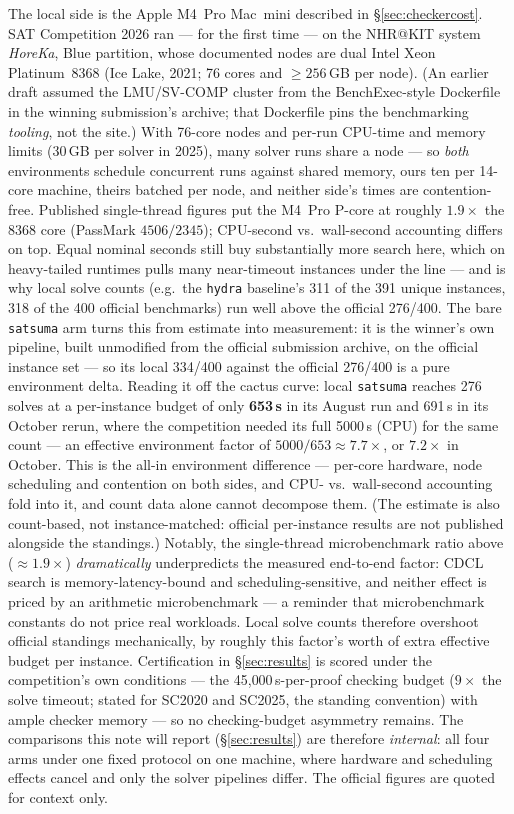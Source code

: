 \documentclass[10pt]{article}
\begin{document}
The local side is the Apple M4~Pro Mac~mini described in
\S\ref{sec:checkercost}. SAT Competition 2026 ran --- for the first
time --- on the NHR@KIT system \emph{HoreKa}, Blue partition, whose
documented nodes are dual Intel Xeon Platinum~8368 (Ice Lake, 2021;
76 cores and $\geq 256$\,GB per node). (An earlier draft assumed the
LMU/SV-COMP cluster from the BenchExec-style Dockerfile in the
winning submission's archive; that Dockerfile pins the benchmarking
\emph{tooling}, not the site.) With 76-core nodes and per-run
CPU-time and memory limits (30\,GB per solver in 2025), many solver
runs share a node --- so \emph{both} environments schedule concurrent
runs against shared memory, ours ten per 14-core machine, theirs
batched per node, and neither side's times are contention-free.
Published single-thread figures put the M4~Pro P-core at roughly
$1.9\times$ the 8368 core (PassMark $4506/2345$); CPU-second vs.\
wall-second accounting differs on top. Equal nominal seconds still
buy substantially more search here, which on heavy-tailed runtimes
pulls many near-timeout instances under the line --- and is why local
solve counts (e.g.\ the \texttt{hydra} baseline's 311 of the 391
unique instances, 318 of the 400 official benchmarks) run well above the
official 276/400. The bare \texttt{satsuma} arm turns this from estimate into
measurement: it is the winner's own pipeline, built unmodified from
the official submission archive, on the official instance set --- so
its local 334/400 against the official 276/400 is a pure environment
delta. Reading it off the cactus curve: local \texttt{satsuma}
reaches 276 solves at a per-instance budget of only \textbf{653\,s}
in its August run and 691\,s in its October rerun, where the
competition needed its full 5000\,s (CPU) for the same count --- an
effective environment factor of
$5000/653 \approx \mathbf{7.7\times}$, or $7.2\times$ in October. This is the all-in
environment difference --- per-core hardware, node scheduling and
contention on both sides, and CPU- vs.\ wall-second accounting fold
into it, and count data alone cannot decompose them. (The estimate is
also count-based, not instance-matched: official per-instance results
are not published alongside the standings.) Notably, the
single-thread microbenchmark ratio above ($\approx 1.9\times$)
\emph{dramatically} underpredicts the measured end-to-end factor:
CDCL search is memory-latency-bound and scheduling-sensitive, and
neither effect is priced by an arithmetic microbenchmark --- a
reminder that microbenchmark constants do not price real workloads.
Local solve counts therefore overshoot official standings
mechanically, by roughly this factor's worth of extra effective
budget per instance. Certification in \S\ref{sec:results} is scored under the
competition's own conditions --- the 45{,}000\,s-per-proof checking
budget ($9\times$ the solve timeout; stated for SC2020 and SC2025,
the standing convention) with ample checker memory --- so no
checking-budget asymmetry remains. The comparisons this note will
report (\S\ref{sec:results}) are therefore \emph{internal}: all four
arms under one fixed protocol on one machine, where hardware and
scheduling effects cancel and only the solver pipelines differ. The
official figures are quoted for context only.
\end{document}
